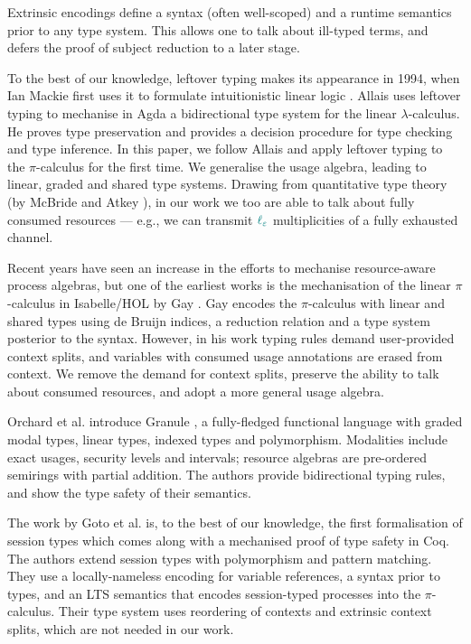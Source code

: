\documentclass[]{llncs}
\newcommand{\lambdacalc}{$\lambda$-calculus}
\newcommand{\picalc}{$\pi$-calculus}
\newcommand{\func}[1]{\textcolor{teal}{\operatorname{#1}}}
\newcommand{\lz}{\func{\ell_{\varepsilon}}}
\begin{document}
Extrinsic encodings define a syntax (often well-scoped) and a runtime semantics prior to any type system.
This allows one to talk about ill-typed terms, and defers the proof of subject reduction to a later stage.

To the best of our knowledge, leftover typing makes its appearance in 1994, when Ian Mackie first uses it to formulate intuitionistic linear logic \cite{Mackie}.
Allais \cite{Allais2018a} uses leftover typing to mechanise in Agda a bidirectional type system for the linear \lambdacalc{}.
He proves type preservation and provides a decision procedure for type checking and type inference.
In this paper, we follow Allais \cite{Allais2018a} and apply leftover typing to the \picalc{} for the first time.
We generalise the usage algebra, leading to linear, graded and shared type systems.
Drawing from quantitative type theory (by McBride and Atkey \cite{McBride2016,Atkey2018}), in our work we too are able to talk about fully consumed resources --- e.g., we can transmit $\lz$ multiplicities of a fully exhausted channel.

Recent years have seen an increase in the efforts to mechanise resource-aware process algebras, but one of the earliest works is the mechanisation of the linear \picalc{} in Isabelle/HOL by Gay \cite{Gay2001}.
Gay encodes the \picalc{} with linear and shared types using de Bruijn indices, a reduction relation and a type system posterior to the syntax.
However, in his work typing rules demand user-provided context splits, and variables with consumed usage annotations are erased from context.
We remove the demand for context splits, preserve the ability to talk about consumed resources, and adopt a more general usage algebra.

Orchard et al. introduce Granule \cite{Orchard}, a fully-fledged functional language with graded modal types, linear types, indexed types and polymorphism.
Modalities include exact usages, security levels and intervals; resource algebras are pre-ordered semirings with partial addition.
The authors provide bidirectional typing rules, and show the type safety of their semantics.

The work by Goto et al. \cite{Goto2016a} is, to the best of our knowledge, the first formalisation of session types which comes along with a mechanised proof of type safety in Coq.
The authors extend session types with polymorphism and pattern matching.
They use a locally-nameless encoding for variable references, a syntax prior to types, and an LTS semantics that encodes session-typed processes into the \picalc{}.
Their type system uses reordering of contexts and extrinsic context splits, which are not needed in our work. 
\end{document}
